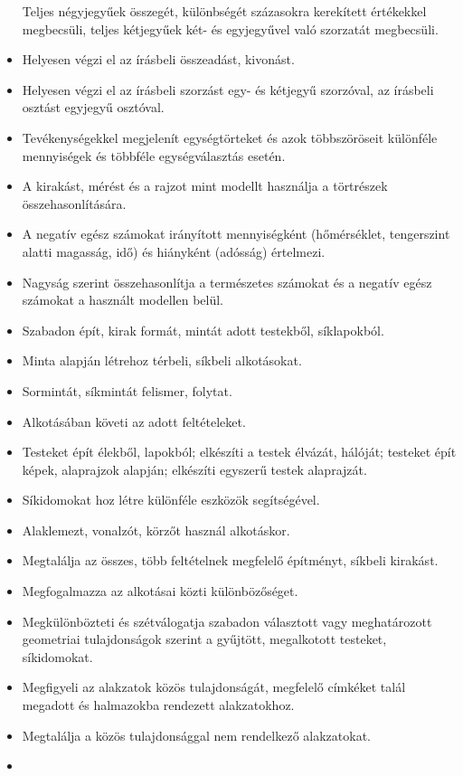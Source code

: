 \begin{itemize}
  Teljes négyjegyűek összegét, különbségét százasokra kerekített
  értékekkel megbecsüli, teljes kétjegyűek két- és egyjegyűvel való
  szorzatát megbecsüli.
\item
  Helyesen végzi el az írásbeli összeadást, kivonást.
\item
  Helyesen végzi el az írásbeli szorzást egy- és kétjegyű szorzóval, az
  írásbeli osztást egyjegyű osztóval.
\item
  Tevékenységekkel megjelenít egységtörteket és azok többszöröseit
  különféle mennyiségek és többféle egységválasztás esetén.
\item
  A kirakást, mérést és a rajzot mint modellt használja a törtrészek
  összehasonlítására.
\item
  A negatív egész számokat irányított mennyiségként (hőmérséklet,
  tengerszint alatti magasság, idő) és hiányként (adósság) értelmezi.
\item
  Nagyság szerint összehasonlítja a természetes számokat és a negatív
  egész számokat a használt modellen belül.
\item
  Szabadon épít, kirak formát, mintát adott testekből, síklapokból.
\item
  Minta alapján létrehoz térbeli, síkbeli alkotásokat.
\item
  Sormintát, síkmintát felismer, folytat.
\item
  Alkotásában követi az adott feltételeket.
\item
  Testeket épít élekből, lapokból; elkészíti a testek élvázát, hálóját;
  testeket épít képek, alaprajzok alapján; elkészíti egyszerű testek
  alaprajzát.
\item
  Síkidomokat hoz létre különféle eszközök segítségével.
\item
  Alaklemezt, vonalzót, körzőt használ alkotáskor.
\item
  Megtalálja az összes, több feltételnek megfelelő építményt, síkbeli
  kirakást.
\item
  Megfogalmazza az alkotásai közti különbözőséget.
\item
  Megkülönbözteti és szétválogatja szabadon választott vagy
  meghatározott geometriai tulajdonságok szerint a gyűjtött, megalkotott
  testeket, síkidomokat.
\item
  Megfigyeli az alakzatok közös tulajdonságát, megfelelő címkéket talál
  megadott és halmazokba rendezett alakzatokhoz.
\item
  Megtalálja a közös tulajdonsággal nem rendelkező alakzatokat.
\item

\end{itemize}
